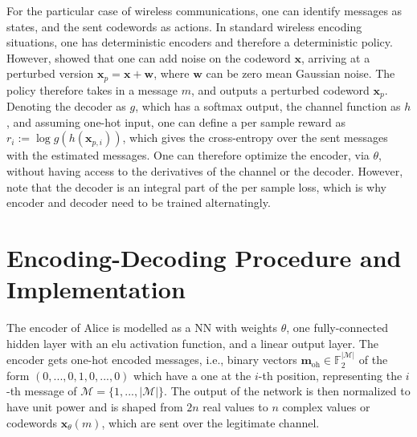 \documentclass[conference, 10pt]{IEEEtran}
\begin{document}
For the particular case of wireless communications, one can identify messages as states, and the sent codewords as actions. In standard wireless encoding situations, one has deterministic encoders and therefore a deterministic policy. However, \cite{Aoudia-RL} showed that one can add noise on the codeword $\mathbf{x}$, arriving at a perturbed version $\mathbf{x}_p = \mathbf{x}+\mathbf{w}$, where $\mathbf{w}$ can be zero mean Gaussian noise. The policy therefore takes in a message $m$, and outputs a perturbed codeword $\mathbf{x}_{p}$. Denoting the decoder as $g$, which has a softmax output, the channel function as $h$, and assuming one-hot input, one can define a per sample reward as $r_i:=\log g(h(\mathbf{x}_{p,i}))$, which gives the cross-entropy over the sent messages with the estimated messages. One can therefore optimize the encoder, via $\theta$, without having access to the derivatives of the channel or the decoder. However, note that the decoder is an integral part of the per sample loss, which is why encoder and decoder need to be trained alternatingly.

\section{Encoding-Decoding Procedure and Implementation}

\label{sec:Enc-Dec-Impl}
The encoder of Alice is modelled as a NN with weights $\theta$, one fully-connected hidden layer with an elu activation function, and a linear output layer. The encoder gets one-hot encoded messages, i.e., binary vectors $\mathbf{m}_{\text{oh}}\in\mathbb{F}_2^ {|\mathcal{M}|}$ of the form $(0,...,0,1,0,...,0)$ which have a one at the $i$-th position, representing the $i$-th message of $\mathcal{M}=\{1,...,|\mathcal{M}|\}$. The output of the network is then normalized to have unit power and is shaped from $2n$ real values to $n$ complex values or codewords $\mathbf{x}_{\theta}(m)$, which are sent over the legitimate channel. 
\end{document}
